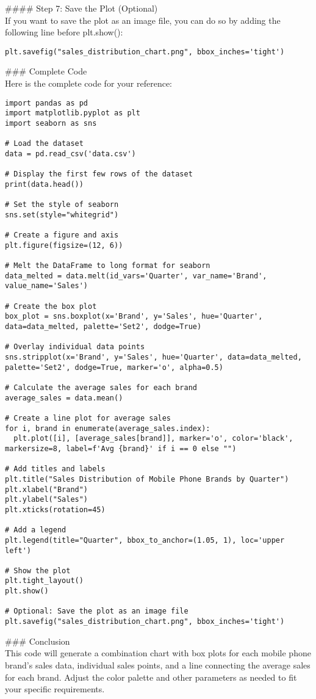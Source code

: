 \begin{mdframed}[backgroundcolor=gray!20, linewidth=1pt]
\#\#\#\# Step 7: Save the Plot (Optional)\\
If you want to save the plot as an image file, you can do so by adding the following line before plt.show():

\begin{lstlisting}[style=pythonstyle]
plt.savefig("sales_distribution_chart.png", bbox_inches='tight')
\end{lstlisting}

\#\#\# Complete Code\\
Here is the complete code for your reference:

\begin{lstlisting}[style=pythonstyle]
import pandas as pd
import matplotlib.pyplot as plt
import seaborn as sns

# Load the dataset
data = pd.read_csv('data.csv')

# Display the first few rows of the dataset
print(data.head())

# Set the style of seaborn
sns.set(style="whitegrid")

# Create a figure and axis
plt.figure(figsize=(12, 6))

# Melt the DataFrame to long format for seaborn
data_melted = data.melt(id_vars='Quarter', var_name='Brand', value_name='Sales')

# Create the box plot
box_plot = sns.boxplot(x='Brand', y='Sales', hue='Quarter', data=data_melted, palette='Set2', dodge=True)

# Overlay individual data points
sns.stripplot(x='Brand', y='Sales', hue='Quarter', data=data_melted, palette='Set2', dodge=True, marker='o', alpha=0.5)

# Calculate the average sales for each brand
average_sales = data.mean()

# Create a line plot for average sales
for i, brand in enumerate(average_sales.index):
  plt.plot([i], [average_sales[brand]], marker='o', color='black', markersize=8, label=f'Avg {brand}' if i == 0 else "")

# Add titles and labels
plt.title("Sales Distribution of Mobile Phone Brands by Quarter")
plt.xlabel("Brand")
plt.ylabel("Sales")
plt.xticks(rotation=45)

# Add a legend
plt.legend(title="Quarter", bbox_to_anchor=(1.05, 1), loc='upper left')

# Show the plot
plt.tight_layout()
plt.show()

# Optional: Save the plot as an image file
plt.savefig("sales_distribution_chart.png", bbox_inches='tight')
\end{lstlisting}

\#\#\# Conclusion\\
This code will generate a combination chart with box plots for each mobile phone brand's sales data, individual sales points, and a line connecting the average sales for each brand. Adjust the color palette and other parameters as needed to fit your specific requirements.


\end{mdframed}



